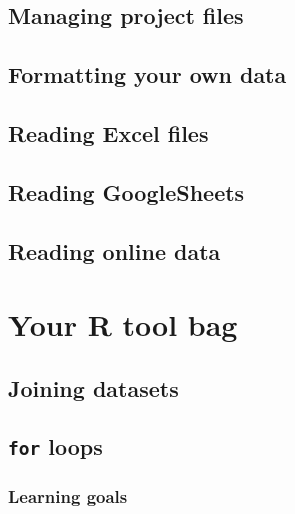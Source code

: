 \documentclass[
]{book}
\begin{document}
\hypertarget{managing-project-files}{%
\chapter{Managing project files}\label{managing-project-files}}

\hypertarget{formatting-your-own-data}{%
\chapter{Formatting your own data}\label{formatting-your-own-data}}

\hypertarget{reading-excel-files}{%
\chapter{Reading Excel files}\label{reading-excel-files}}

\hypertarget{reading-googlesheets}{%
\chapter{Reading GoogleSheets}\label{reading-googlesheets}}

\hypertarget{reading-online-data}{%
\chapter{Reading online data}\label{reading-online-data}}

\hypertarget{part-your-r-tool-bag}{%
\part{Your R tool bag}\label{part-your-r-tool-bag}}

\hypertarget{joining-datasets}{%
\chapter{Joining datasets}\label{joining-datasets}}

\hypertarget{for-loops}{%
\chapter{\texorpdfstring{\texttt{for} loops}{for loops}}\label{for-loops}}

\hypertarget{learning-goals-4}{%
\section*{Learning goals}\label{learning-goals-4}}
\end{document}
